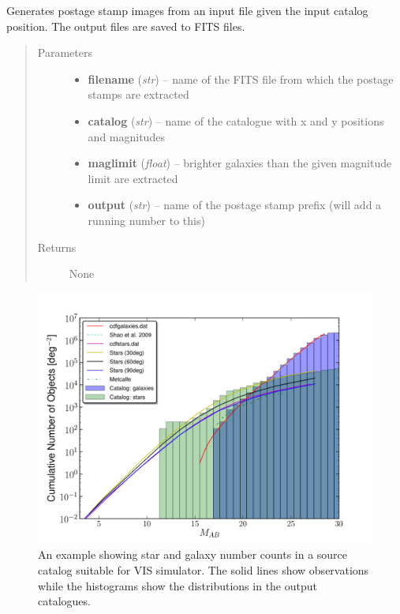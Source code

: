 \documentclass[a4paper,11pt,english]{sphinxmanual}
\begin{document}
\begin{fulllineitems}
\label{sources:sources.generatePostageStamps.generaPostageStamps}
Generates postage stamp images from an input file given the input catalog position.
The output files are saved to FITS files.
\begin{quote}\begin{description}
\item[{Parameters}] \leavevmode\begin{itemize}
\item {} 
\textbf{filename} (\emph{str}) -- name of the FITS file from which the postage stamps are extracted

\item {} 
\textbf{catalog} (\emph{str}) -- name of the catalogue with x and y positions and magnitudes

\item {} 
\textbf{maglimit} (\emph{float}) -- brighter galaxies than the given magnitude limit are extracted

\item {} 
\textbf{output} (\emph{str}) -- name of the postage stamp prefix (will add a running number to this)

\end{itemize}

\item[{Returns}] \leavevmode
None

\end{description}\end{quote}

\end{fulllineitems}

\begin{figure}[htbp]
\centering
\capstart

\includegraphics{Distributions.pdf}
\caption{An example showing star and galaxy number counts in a source catalog suitable for VIS simulator.
The solid lines show observations while the histograms show the distributions in the output catalogues.}\end{figure}
\end{document}
